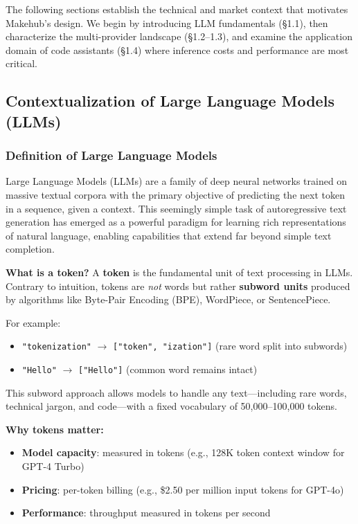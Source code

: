 \documentclass[english]{article}
\begin{document}
The following sections establish the technical and market context that motivates Makehub's design. We begin by introducing LLM fundamentals (§1.1), then characterize the multi-provider landscape (§1.2--1.3), and examine the application domain of code assistants (§1.4) where inference costs and performance are most critical.

\subsection{Contextualization of Large Language Models (LLMs)}

\subsubsection{Definition of Large Language Models}

Large Language Models (LLMs) are a family of deep neural networks trained on massive textual corpora with the primary objective of predicting the next token in a sequence, given a context. This seemingly simple task of autoregressive text generation has emerged as a powerful paradigm for learning rich representations of natural language, enabling capabilities that extend far beyond simple text completion.

\medskip

\noindent\textbf{What is a token?}
A \textbf{token} is the fundamental unit of text processing in LLMs. Contrary to intuition, tokens are \emph{not} words but rather \textbf{subword units} produced by algorithms like Byte-Pair Encoding (BPE), WordPiece, or SentencePiece.

For example:
\begin{itemize}
    \item \texttt{"tokenization"} $\rightarrow$ \texttt{["token", "ization"]} (rare word split into subwords)
    \item \texttt{"Hello"} $\rightarrow$ \texttt{["Hello"]} (common word remains intact)
\end{itemize}

\noindent This subword approach allows models to handle any text—including rare words, technical jargon, and code—with a fixed vocabulary of 50,000--100,000 tokens.

\medskip

\noindent\textbf{Why tokens matter:}
\begin{itemize}
    \item \textbf{Model capacity}: measured in tokens (e.g., 128K token context window for GPT-4 Turbo)
    \item \textbf{Pricing}: per-token billing (e.g., \$2.50 per million input tokens for GPT-4o)
    \item \textbf{Performance}: throughput measured in tokens per second
\end{itemize}
\end{document}
